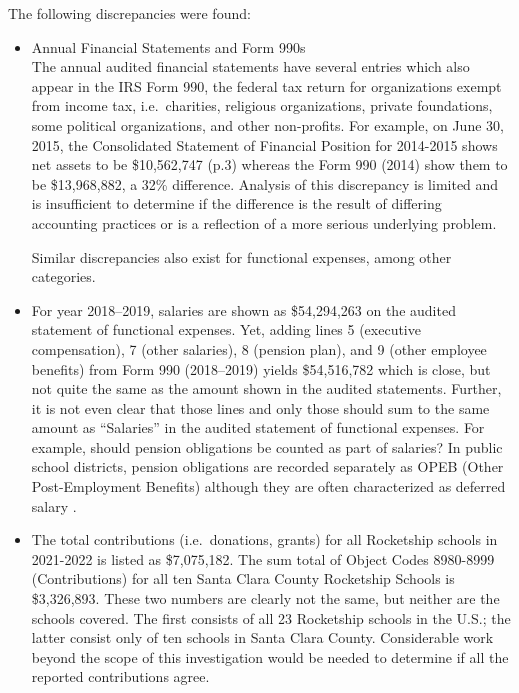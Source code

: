 The following discrepancies were found:
\begin{itemize}
  \item Annual Financial Statements and Form 990s\\
  The annual audited financial statements have several entries which also appear in the IRS Form 990, the federal tax return for organizations exempt from income tax, i.e.\ charities, religious organizations, private foundations, some political organizations, and other non-profits. For example, on June 30, 2015, the Consolidated Statement of Financial Position for 2014-2015 shows net assets to be \$10,562,747 (p.3) whereas the Form 990 (2014) show them to be \$13,968,882, a 32\% difference. Analysis of this discrepancy is limited and is insufficient to determine if the difference is the result of differing accounting practices or is a reflection of a more serious underlying problem.

  Similar discrepancies also exist for functional expenses, among other categories.
 \item For year 2018–2019, salaries are shown as \$54,294,263 on the audited statement of functional expenses. Yet, adding lines 5 (executive compensation), 7 (other salaries), 8 (pension plan), and 9 (other employee benefits) from Form 990 (2018–2019) yields \$54,516,782 which is close, but not quite the same as the amount shown in the audited statements. Further, it is not even clear that those lines and only those should sum to the same amount as ``Salaries'' in the audited statement of functional expenses.  For example, should pension obligations be counted as part of salaries? In public school districts, pension obligations are recorded separately as OPEB (Other Post-Employment Benefits) although they are often characterized as deferred salary \parencite{Kagan2022}. 

  \item The total contributions (i.e.\ donations, grants) for all Rocketship schools in 2021-2022 is listed as \$7,075,182. The sum total of Object Codes 8980-8999 (Contributions) for all ten Santa Clara County Rocketship Schools is \$3,326,893. These two numbers are clearly not the same, but neither are the schools covered. The first consists of all 23 Rocketship schools in the U.S.; the latter consist only of ten schools in Santa Clara County. Considerable work beyond the scope of this investigation would be needed to determine if all the reported contributions agree.


\end{itemize}
